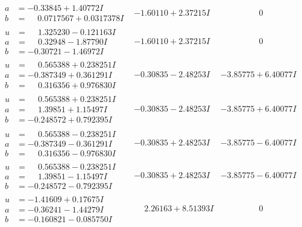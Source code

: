 \documentclass[1p]{elsarticle_modified}
\theoremstyle{definition}
\begin{document}
$$\begin{array}{c|c|c}
\begin{aligned}
a &= -0.33845 + 1.40772 I \\
b &= \phantom{-}0.0717567 + 0.0317378 I\end{aligned}
 & -1.60110 + 2.37215 I & \phantom{-0.000000 } 0 \\ \hline\begin{aligned}
u &= \phantom{-}1.325230 - 0.121163 I \\
a &= \phantom{-}0.32948 - 1.87790 I \\
b &= -0.30721 - 1.46972 I\end{aligned}
 & -1.60110 + 2.37215 I & \phantom{-0.000000 } 0 \\ \hline\begin{aligned}
u &= \phantom{-}0.565388 + 0.238251 I \\
a &= -0.387349 + 0.361291 I \\
b &= \phantom{-}0.316356 + 0.976830 I\end{aligned}
 & -0.30835 - 2.48253 I & -3.85775 + 6.40077 I \\ \hline\begin{aligned}
u &= \phantom{-}0.565388 + 0.238251 I \\
a &= \phantom{-}1.39851 + 1.15497 I \\
b &= -0.248572 + 0.792395 I\end{aligned}
 & -0.30835 - 2.48253 I & -3.85775 + 6.40077 I \\ \hline\begin{aligned}
u &= \phantom{-}0.565388 - 0.238251 I \\
a &= -0.387349 - 0.361291 I \\
b &= \phantom{-}0.316356 - 0.976830 I\end{aligned}
 & -0.30835 + 2.48253 I & -3.85775 - 6.40077 I \\ \hline\begin{aligned}
u &= \phantom{-}0.565388 - 0.238251 I \\
a &= \phantom{-}1.39851 - 1.15497 I \\
b &= -0.248572 - 0.792395 I\end{aligned}
 & -0.30835 + 2.48253 I & -3.85775 - 6.40077 I \\ \hline\begin{aligned}
u &= -1.41609 + 0.17675 I \\
a &= -0.36241 - 1.44279 I \\
b &= -0.160821 - 0.085750 I\end{aligned}
 & \phantom{-}2.26163 + 8.51393 I & \phantom{-0.000000 } 0 \\ \hline\begin{aligned}

\end{aligned}
\end{array}$$
\end{document}
